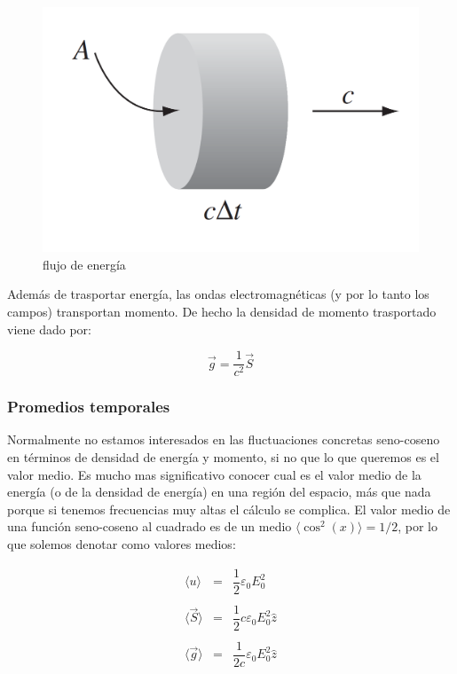 \documentclass[12pt]{article}
\begin{document}
\begin{figure}[h!] \centering
\includegraphics[scale=0.4]{densidadenergia.png}
\caption{flujo de energía}
\end{figure}

Además de trasportar energía, las ondas electromagnéticas (y por lo tanto los campos) transportan momento. De hecho la densidad de momento trasportado viene dado por:

\begin{equation}
\vec{g} = \dfrac{1}{c^2} \vec{S}
\end{equation}



\subsubsection{Promedios temporales}

Normalmente no estamos interesados en las fluctuaciones concretas seno-coseno en términos de densidad de energía y momento, si no que lo que queremos es el valor medio. Es mucho mas significativo conocer cual es el valor medio de la energía (o de la densidad de energía) en una región del espacio, más que nada porque si tenemos frecuencias muy altas el cálculo se complica. El valor medio de una función seno-coseno al cuadrado es de un medio $\langle \cos^2 (x) \rangle = 1/2$, por lo que solemos denotar como valores medios:

\begin{equation}
\begin{array}{lll}

\langle u \rangle & = & \dfrac{1}{2} \varepsilon_0  E_0 ^2 \\ \\

\langle \vec{S} \rangle & = & \dfrac{1}{2} c \varepsilon_0  E_0 ^2 \widehat{z} \\ \\

\langle \vec{g} \rangle & = & \dfrac{1}{2c} \varepsilon_0  E_0 ^2 \widehat{z}
 

\end{array}
\end{equation}
\end{document}
